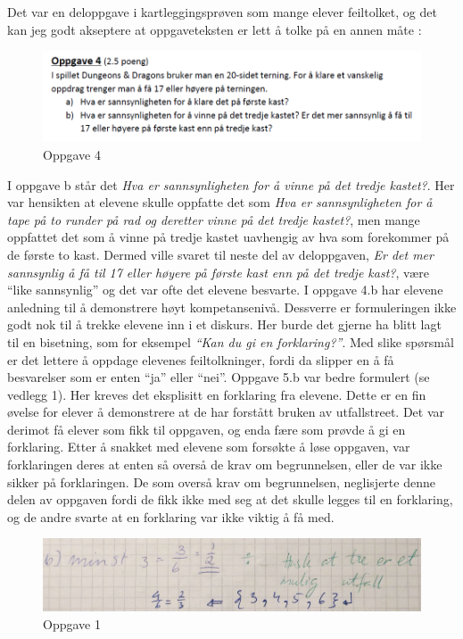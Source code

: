 \documentclass[main.tex]{subfiles}
\begin{document}
Det var en deloppgave i kartleggingsprøven som mange elever feiltolket, og det kan jeg godt
akseptere at oppgaveteksten er lett å tolke på en annen måte :
\par
\begin{figure}[h!]
\centering
\includegraphics[scale = 0.7]{../figures/oppgave4b.png}
\caption{Oppgave 4}
\label{fig:oppgave4}
\end{figure}
I oppgave b står det \emph{Hva er sannsynligheten for å vinne på det tredje kastet?}. Her var hensikten at
elevene skulle oppfatte det som \emph{Hva er sannsynligheten for å tape på to runder på rad og deretter vinne på 
det tredje kastet?}, men mange oppfattet det som å vinne på tredje kastet uavhengig av hva som forekommer på de 
første to kast. Dermed ville svaret til neste del av deloppgaven, \emph{Er det mer sannsynlig å få til 17 eller 
høyere på første kast enn på det tredje kast?},  være ``like sannsynlig'' og det var ofte det elevene besvarte. 
I oppgave 4.b har elevene anledning til å demonstrere høyt kompetansenivå. Dessverre er formuleringen ikke
godt nok til å trekke elevene inn i et diskurs. Her burde det gjerne ha blitt lagt til en bisetning, som 
for eksempel \emph{``Kan du gi en forklaring?''}. Med slike spørsmål er det lettere å oppdage elevenes
feiltolkninger, fordi da slipper en å få besvarelser som er enten ``ja'' eller ``nei''. Oppgave 
5.b var bedre formulert (se vedlegg 1). Her kreves det eksplisitt en forklaring fra elevene.
Dette er en fin øvelse for elever å demonstrere at de har forstått bruken av utfallstreet. Det var derimot
få elever som fikk til oppgaven, og enda fære som prøvde å gi en forklaring. Etter å snakket med elevene
som forsøkte å løse oppgaven, var forklaringen deres at enten så overså de krav om begrunnelsen, eller de var
ikke sikker på forklaringen. De som overså krav om begrunnelsen, neglisjerte denne delen av oppgaven fordi
de fikk ikke med seg at det skulle legges til en forklaring, og de andre svarte at en forklaring var ikke
viktig å få med. 

\begin{figure}
\centering
\includegraphics[scale = 0.4]{../figures/maryam.png}
\caption{Oppgave 1}
\label{fig:maryam}
\end{figure}
\end{document}
